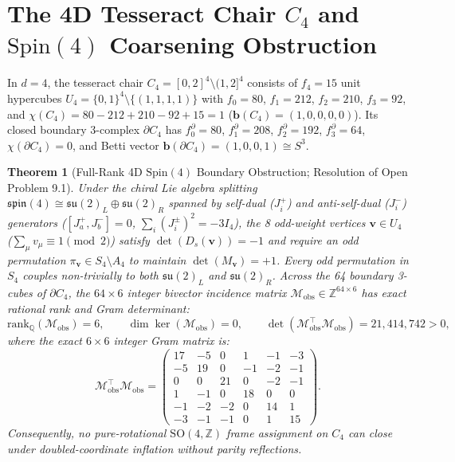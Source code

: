 \documentclass[11pt,a4paper]{article}
\newtheorem{theorem}{Theorem}[section]
\theoremstyle{definition}
\begin{document}
\section{The 4D Tesseract Chair $C_4$ and $\mathrm{Spin}(4)$ Coarsening Obstruction}

In $d=4$, the tesseract chair $C_4 = [0,2]^4 \setminus (1,2]^4$ consists of $f_4 = 15$ unit hypercubes $U_4 = \{0,1\}^4 \setminus \{(1,1,1,1)\}$ with $f_0=80$, $f_1=212$, $f_2=210$, $f_3=92$, and $\chi(C_4) = 80 - 212 + 210 - 92 + 15 = 1$ ($\mathbf{b}(C_4)=(1,0,0,0,0)$). Its closed boundary 3-complex $\partial C_4$ has $f_0^\partial=80$, $f_1^\partial=208$, $f_2^\partial=192$, $f_3^\partial=64$, $\chi(\partial C_4) = 0$, and Betti vector $\mathbf{b}(\partial C_4) = (1,0,0,1) \cong S^3$.

\begin{theorem}[Full-Rank 4D $\mathrm{Spin}(4)$ Boundary Obstruction; Resolution of Open Problem 9.1]
Under the chiral Lie algebra splitting $\mathfrak{spin}(4) \cong \mathfrak{su}(2)_L \oplus \mathfrak{su}(2)_R$ spanned by self-dual ($J_i^+$) and anti-self-dual ($J_i^-$) generators ($[J_a^+, J_b^-] = 0$, $\sum_i (J_i^\pm)^2 = -3 I_4$), the 8 odd-weight vertices $\mathbf{v} \in U_4$ ($\sum_\mu v_\mu \equiv 1 \pmod 2$) satisfy $\det(D_s(\mathbf{v})) = -1$ and require an odd permutation $\pi_{\mathbf{v}} \in S_4 \setminus A_4$ to maintain $\det(M_{\mathbf{v}}) = +1$. Every odd permutation in $S_4$ couples non-trivially to both $\mathfrak{su}(2)_L$ and $\mathfrak{su}(2)_R$. Across the 64 boundary 3-cubes of $\partial C_4$, the $64\times 6$ integer bivector incidence matrix $\mathcal{M}_{\mathrm{obs}} \in \mathbb{Z}^{64\times 6}$ has exact rational rank and Gram determinant:
\begin{equation}
\mathrm{rank}_{\mathbb{Q}}(\mathcal{M}_{\mathrm{obs}}) = 6, \qquad \dim\ker(\mathcal{M}_{\mathrm{obs}}) = 0, \qquad \det(\mathcal{M}_{\mathrm{obs}}^\top \mathcal{M}_{\mathrm{obs}}) = 21{,}414{,}742 > 0,
\end{equation}
where the exact $6\times 6$ integer Gram matrix is:
\begin{equation}
\mathcal{M}_{\mathrm{obs}}^\top \mathcal{M}_{\mathrm{obs}} = \begin{pmatrix}
17 & -5 & 0 & 1 & -1 & -3 \\
-5 & 19 & 0 & -1 & -2 & -1 \\
0 & 0 & 21 & 0 & -2 & -1 \\
1 & -1 & 0 & 18 & 0 & 0 \\
-1 & -2 & -2 & 0 & 14 & 1 \\
-3 & -1 & -1 & 0 & 1 & 15
\end{pmatrix}.
\end{equation}
Consequently, no pure-rotational $\mathrm{SO}(4,\mathbb{Z})$ frame assignment on $C_4$ can close under doubled-coordinate inflation without parity reflections.
\end{theorem}
\end{document}
